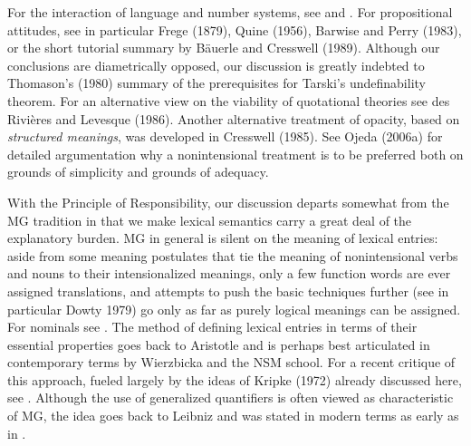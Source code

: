 For the interaction of language and number systems, see 
and . For propositional attitudes, see in particular Frege
(1879), Quine (1956), Barwise and Perry (1983), or the short tutorial summary
by B\"auerle and Cresswell (1989).  Although our conclusions are diametrically
opposed, our discussion is greatly indebted to Thomason's (1980) summary of
the prerequisites for Tarski's undefinability theorem. \nocite{Thomason:1980}
\nocite{Priest:1979} \nocite{Priest:1989} \nocite{Barwise:1987}
\nocite{Walker:2003} \nocite{Visser:1989} \nocite{Frege:1879}
\nocite{Quine:1956} \nocite{Ba2uerle:1989} For an alternative view on the
viability of quotational theories see des Rivi\`{e}res and Levesque (1986).
\nocite{Rivieres:1986} Another alternative treatment of opacity, based on {\it
  structured meanings}, was developed in Cresswell (1985). See Ojeda (2006a)
for detailed argumentation why a nonintensional treatment is to be preferred
both on grounds of simplicity and grounds of adequacy.
\nocite{Cresswell:1985} \nocite{Ojeda:2006a}

With the Principle of Responsibility, our discussion departs somewhat from the
MG tradition in that we make lexical semantics carry a great deal of the
explanatory burden.  MG in general is silent on the meaning of lexical
entries: aside from some meaning postulates that tie the meaning of
nonintensional verbs and nouns to their intensionalized meanings, only a few
function words are ever assigned translations, and attempts to push the basic
techniques further (see in particular Dowty 1979) \nocite{Dowty:1979} go only
as far as purely logical meanings can be assigned. For nominals see
. The method of defining lexical entries in terms of
their essential properties goes back to Aristotle and is perhaps best
articulated in contemporary terms by Wierzbicka and the NSM school. For a
recent critique of this approach, fueled largely by the ideas of Kripke (1972)
already discussed here, see .  Although the use of
generalized quantifiers is often viewed as characteristic of MG, the idea goes
back to Leibniz and was stated in modern terms as early as in
.

